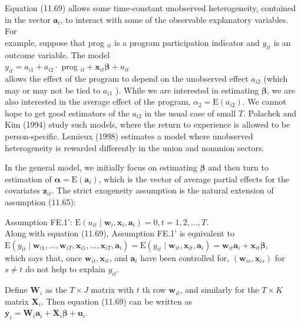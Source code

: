 \documentclass[10pt]{article}
\begin{document}
Equation (11.69) allows some time-constant unobserved heterogeneity, contained in the vector $\mathbf{a}_{i}$, to interact with some of the observable explanatory variables. For\\
example, suppose that prog $_{i t}$ is a program participation indicator and $y_{i t}$ is an outcome variable. The model\\
$y_{i t}=a_{i 1}+a_{i 2} \cdot$ prog $_{i t}+\mathbf{x}_{i t} \boldsymbol{\beta}+u_{i t}$\\
allows the effect of the program to depend on the unobserved effect $a_{i 2}$ (which may or may not be tied to $a_{i 1}$ ). While we are interested in estimating $\boldsymbol{\beta}$, we are also interested in the average effect of the program, $\alpha_{2}=\mathrm{E}\left(a_{i 2}\right)$. We cannot hope to get good estimators of the $a_{i 2}$ in the usual case of small $T$. Polachek and Kim (1994) study such models, where the return to experience is allowed to be person-specific. Lemieux (1998) estimates a model where unobserved heterogeneity is rewarded differently in the union and nonunion sectors.

In the general model, we initially focus on estimating $\boldsymbol{\beta}$ and then turn to estimation of $\boldsymbol{\alpha}=\mathrm{E}\left(\mathbf{a}_{i}\right)$, which is the vector of average partial effects for the covariates $\mathbf{z}_{i t}$. The strict exogeneity assumption is the natural extension of assumption (11.65):

Assumption FE.1': $\mathrm{E}\left(u_{i t} \mid \mathbf{w}_{i}, \mathbf{x}_{i}, \mathbf{a}_{i}\right)=0, t=1,2, \ldots, T$.\\
Along with equation (11.69), Assumption FE.1' is equivalent to\\
$\mathrm{E}\left(y_{i t} \mid \mathbf{w}_{i 1}, \ldots, \mathbf{w}_{i T}, \mathbf{x}_{i 1}, \ldots, \mathbf{x}_{i T}, \mathbf{a}_{i}\right)=\mathrm{E}\left(y_{i t} \mid \mathbf{w}_{i t}, \mathbf{x}_{i t}, \mathbf{a}_{i}\right)=\mathbf{w}_{i t} \mathbf{a}_{i}+\mathbf{x}_{i t} \boldsymbol{\beta}$,\\
which says that, once $\mathbf{w}_{i t}, \mathbf{x}_{i t}$, and $\mathbf{a}_{i}$ have been controlled for, $\left(\mathbf{w}_{i s}, \mathbf{x}_{i s}\right)$ for $s \neq t$ do not help to explain $y_{i t}$.

Define $\mathbf{W}_{i}$ as the $T \times J$ matrix with $t$ th row $\mathbf{w}_{i t}$, and similarly for the $T \times K$ matrix $\mathbf{X}_{i}$. Then equation (11.69) can be written as\\
$\mathbf{y}_{i}=\mathbf{W}_{i} \mathbf{a}_{i}+\mathbf{X}_{i} \boldsymbol{\beta}+\mathbf{u}_{i}$.
\end{document}
